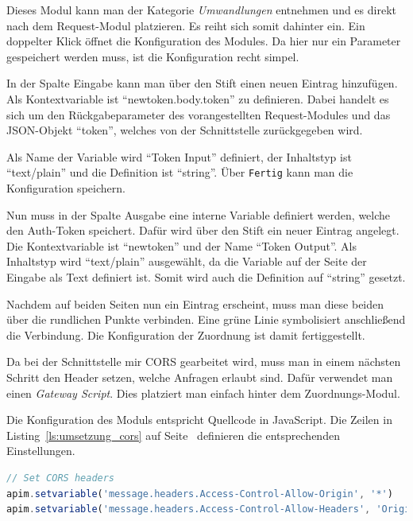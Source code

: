 Dieses Modul kann man der Kategorie \textit{Umwandlungen} entnehmen und es direkt nach dem Request-Modul platzieren. Es
reiht sich somit dahinter ein. Ein doppelter Klick öffnet die Konfiguration des Modules. Da hier nur ein Parameter
gespeichert werden muss, ist die Konfiguration recht simpel.

In der Spalte Eingabe kann man über den Stift einen neuen Eintrag hinzufügen. Als Kontextvariable ist
\enquote{newtoken.body.token} zu definieren. Dabei handelt es sich um den Rückgabeparameter des vorangestellten
Request-Modules und das JSON-Objekt \enquote{token}, welches von der Schnittstelle zurückgegeben wird.

Als Name der Variable wird \enquote{Token Input} definiert, der Inhaltstyp ist \enquote{text/plain} und die Definition
ist \enquote{string}. Über \texttt{Fertig} kann man die Konfiguration speichern.

Nun muss in der Spalte Ausgabe eine interne Variable definiert werden, welche den Auth-Token speichert. Dafür wird über
den Stift ein neuer Eintrag angelegt. Die Kontextvariable ist \enquote{newtoken} und der Name \enquote{Token Output}.
Als Inhaltstyp wird \enquote{text/plain} ausgewählt, da die Variable auf der Seite der Eingabe als Text definiert ist.
Somit wird auch die Definition auf \enquote{string} gesetzt.

Nachdem auf beiden Seiten nun ein Eintrag erscheint, muss man diese beiden über die rundlichen Punkte verbinden. Eine
grüne Linie symbolisiert anschließend die Verbindung. Die Konfiguration der Zuordnung ist damit fertiggestellt.

Da bei der Schnittstelle mir CORS gearbeitet wird, muss man in einem nächsten Schritt den Header setzen, welche Anfragen
erlaubt sind. Dafür verwendet man einen \textit{Gateway Script}. Dies platziert man einfach hinter dem Zuordnungs-Modul.

Die Konfiguration des Moduls entspricht Quellcode in JavaScript. Die Zeilen in Listing~\ref{ls:umsetzung_cors} auf
Seite~\pageref{ls:umsetzung_cors} definieren die entsprechenden Einstellungen.

\begin{lstlisting}[language=JavaScript, caption=Gateway Script für CORS, label=ls:umsetzung_cors]
// Set CORS headers
apim.setvariable('message.headers.Access-Control-Allow-Origin', '*')
apim.setvariable('message.headers.Access-Control-Allow-Headers', 'Origin, X-Requested-With, Content-Type, Accept')
\end{lstlisting}

